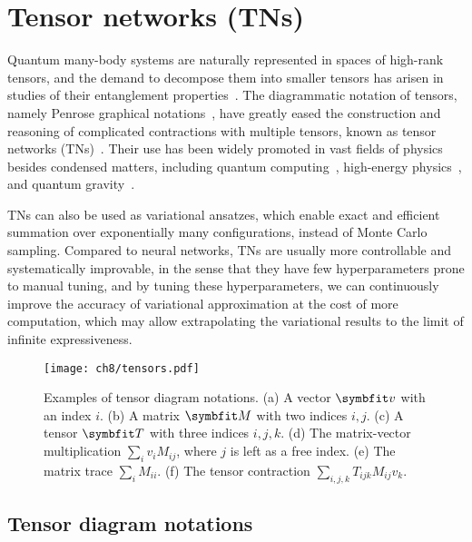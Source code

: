 \chapter{Tensor networks (TNs)}
\label{ch:tn}

Quantum many-body systems are naturally represented in spaces of high-rank tensors, and the demand to decompose them into smaller tensors has arisen in studies of their entanglement properties~\cite{white1992density}. The diagrammatic notation of tensors, namely Penrose graphical notations~\cite{penrose1971applications}, have greatly eased the construction and reasoning of complicated contractions with multiple tensors, known as tensor networks (TNs)~\cite{bridgeman2017hand, orus2014practical}. Their use has been widely promoted in vast fields of physics besides condensed matters, including quantum computing~\cite{nielsen2010quantum, cerezo2021variational}, high-energy physics~\cite{banuls2019tensor, banuls2020review}, and quantum gravity~\cite{perez2013spin, you2016entanglement, hayden2016holographic, asaduzzaman2020tensor}.

TNs can also be used as variational ansatzes, which enable exact and efficient summation over exponentially many configurations, instead of Monte Carlo sampling. Compared to neural networks, TNs are usually more controllable and systematically improvable, in the sense that they have few hyperparameters prone to manual tuning, and by tuning these hyperparameters, we can continuously improve the accuracy of variational approximation at the cost of more computation, which may allow extrapolating the variational results to the limit of infinite expressiveness.

\begin{figure}[htb]
\centering
\texttt{[image: ch8/tensors.pdf]}
\caption[Tensor diagram notations]{
Examples of tensor diagram notations.
(a) A vector $\vv$ with an index $i$.
(b) A matrix $\mM$ with two indices $i, j$.
(c) A tensor $\mT$ with three indices $i, j, k$.
(d) The matrix-vector multiplication $\sum_i v_i M_{i j}$, where $j$ is left as a free index.
(e) The matrix trace $\sum_i M_{i i}$.
(f) The tensor contraction $\sum_{i, j, k} T_{i j k} M_{i j} v_k$.
}
\label{fig:tensors}
\end{figure}

\section{Tensor diagram notations}

